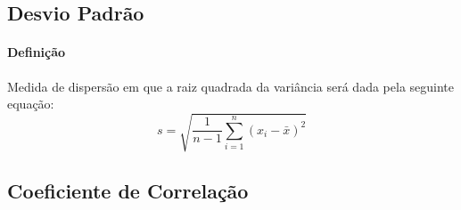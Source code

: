 \documentclass{article}
\begin{document}
        \subsection{Desvio Padrão}
            \paragraph{Definição}Medida de dispersão em que a raiz quadrada da variância será dada pela seguinte equação:
            \begin{equation}
                \boxed{
                    s = \sqrt{\frac{1}{n-1} \sum_{i=1}^{n} (x_{i} - \bar{x})^{2}}
                }
            \end{equation}

        \subsection{Coeficiente de Correlação}
\end{document}
